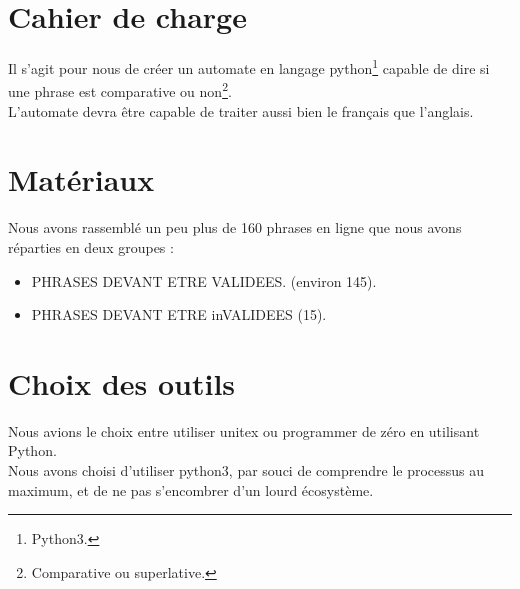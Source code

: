 
\section{Cahier de charge}

Il s'agit pour nous de créer un automate en langage python\footnote{Python3.} capable de dire si une phrase est comparative ou non\footnote{Comparative ou superlative.}. \\

L'automate devra être capable de traiter aussi bien le français que l'anglais.

\section{Matériaux}

Nous avons rassemblé un peu plus de 160 phrases en ligne que nous avons réparties en deux groupes : 
\begin{itemize}
    \item  PHRASES DEVANT ETRE VALIDEES. (environ 145).
    \item  PHRASES DEVANT ETRE inVALIDEES (15).
\end{itemize}


\section{Choix des outils}

Nous avions le choix entre utiliser unitex ou programmer de zéro en utilisant Python. \\

Nous avons choisi d'utiliser python3, par souci de comprendre le processus au maximum, et de ne pas s'encombrer d'un lourd écosystème.
